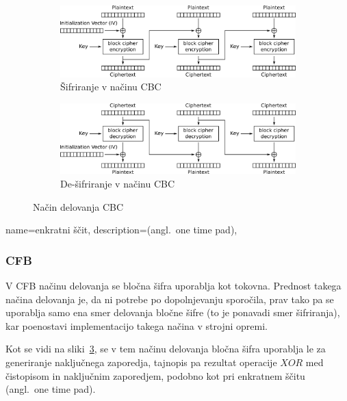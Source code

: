 \documentclass[12pt,a4paper,openany]{book}
\begin{document}
\begin{figure}[h!]
  \centering
  \begin{subfigure}[b]{\textwidth}
    \includegraphics[width=\textwidth]{images/CBC_encryption}
    \caption{Šifriranje v načinu \gls{CBC}}
\label{fig:cbcenc}
  \end{subfigure}
  \begin{subfigure}[b]{\textwidth}
    \includegraphics[width=\textwidth]{images/CBC_decryption}
    \caption{De-šifriranje v načinu \gls{CBC}}
\label{fig:cbcdec}
  \end{subfigure}
  \caption{Način delovanja \gls{CBC}}
\label{fig:cfbmode}
\end{figure}


{
  name=enkratni ščit,
  description={(angl.\ one time pad)},
}

\subsubsection{CFB}
\label{subs:CFB}

V \gls{CFB} načinu delovanja se bločna šifra uporablja kot tokovna. Prednost takega načina delovanja je, da ni potrebe po dopolnjevanju sporočila, prav tako pa se uporablja samo ena smer delovanja bločne šifre (to je ponavadi smer šifriranja), kar poenostavi implementacijo takega načina v strojni opremi.

Kot se vidi na sliki~\ref{fig:cfbmode}, se v tem načinu delovanja bločna šifra uporablja le za generiranje naključnega zaporedja, tajnopis pa rezultat operacije $XOR$ med čistopisom in naključnim zaporedjem, podobno kot pri enkratnem ščitu (angl.\ one time pad).
\end{document}
